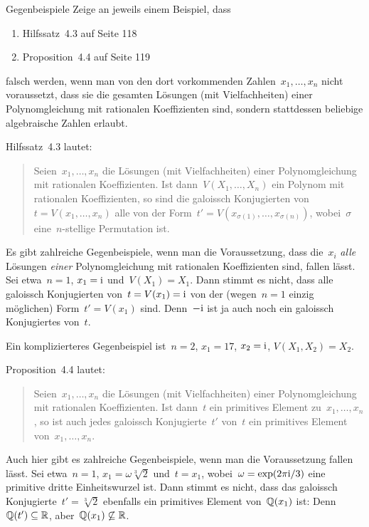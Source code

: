 \documentclass{algblatt}
\begin{document}
\begin{aufgabe}{Gegenbeispiele}
Zeige an jeweils einem Beispiel, dass
\vspace{-0.5em}
\begin{multicols}{2}
\begin{enumerate}
\item Hilfssatz~4.3 auf Seite 118
\item Proposition~4.4 auf Seite 119
\end{enumerate}
\end{multicols}
\vspace{-1em}
falsch werden, wenn man von den dort vorkommenden Zahlen~$x_1,\ldots,x_n$ nicht
voraussetzt, dass sie die gesamten Lösungen (mit Vielfachheiten) einer Polynomgleichung
mit rationalen Koeffizienten sind, sondern stattdessen beliebige algebraische
Zahlen erlaubt.

\begin{loesungE}
\item Hilfssatz~4.3 lautet:
\begin{quote}
Seien~$x_1,\ldots,x_n$ die Lösungen (mit Vielfachheiten) einer Polynomgleichung
mit rationalen Koeffizienten. Ist dann~$V(X_1,\ldots,X_n)$ ein Polynom mit
rationalen Koeffizienten, so sind die galoissch Konjugierten von~$t =
V(x_1,\ldots,x_n)$ alle von der Form~$t' =
V(x_{\sigma(1)},\ldots,x_{\sigma(n)})$, wobei~$\sigma$ eine~$n$-stellige
Permutation ist.
\end{quote}
Es gibt zahlreiche Gegenbeispiele, wenn man die Voraussetzung, dass die~$x_i$
\emph{alle} Lösungen \emph{einer} Polynomgleichung
mit rationalen Koeffizienten sind, fallen lässt. Sei etwa~$n = 1$, $x_1 = \mathrm{i}$
und~$V(X_1) = X_1$. Dann stimmt es nicht, dass alle galoissch Konjugierten
von~$t = V(x_1) = \mathrm{i}$ von der (wegen~$n = 1$ einzig möglichen) Form~$t' =
V(x_1)$ sind. Denn~$-\mathrm{i}$ ist ja auch noch ein galoissch Konjugiertes von~$t$.

Ein komplizierteres Gegenbeispiel ist~$n = 2$, $x_1 = 17$, $x_2 = \mathrm{i}$,
$V(X_1,X_2) = X_2$.

\item Proposition~4.4 lautet:
\begin{quote}
Seien~$x_1,\ldots,x_n$ die Lösungen (mit Vielfachheiten) einer Polynomgleichung
mit rationalen Koeffizienten. Ist dann~$t$ ein primitives Element
zu~$x_1,\ldots,x_n$, so ist auch jedes galoissch Konjugierte~$t'$ von~$t$ ein
primitives Element von~$x_1,\ldots,x_n$.
\end{quote}
Auch hier gibt es zahlreiche Gegenbeispiele, wenn man die Voraussetzung fallen
lässt. Sei etwa~$n = 1$, $x_1 = \omega\sqrt[3]{2}$ und~$t = x_1$,
wobei~$\omega = \exp(2\pi\mathrm{i}/3)$ eine primitive dritte Ein\-heits\-wur\-zel ist. Dann stimmt es
nicht, dass das galoissch Konjugierte~$t' = \sqrt[3]{2}$ ebenfalls ein
primitives Element von~$\mathbb{Q}(x_1)$ ist: Denn~$\mathbb{Q}(t') \subseteq \mathbb{R}$,
aber~$\mathbb{Q}(x_1) \not\subseteq \mathbb{R}$.
\end{loesungE}
\end{aufgabe}
\end{document}
